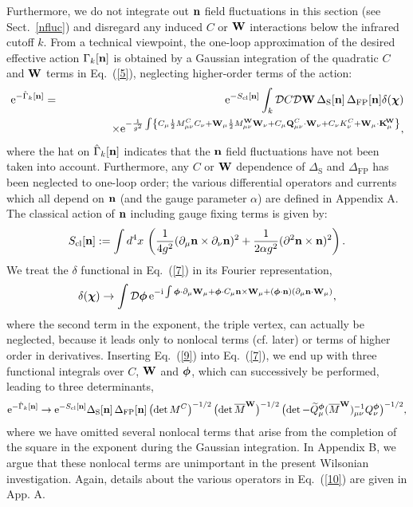 \documentclass[a4paper,12pt]{article}
\newcommand{\I}{\text{i}}
\newcommand{\E}{\text{e}}
\newcommand{\re}[1]{~(\ref{#1})}
\begin{document}
Furthermore, we do not integrate out $\mathbf{n}$ field fluctuations in this
section (see Sect.~\ref{nfluc}) and disregard any induced $C$ or $\mathbf{W}$
interactions below the infrared cutoff $k$. From a technical
viewpoint, the one-loop approximation of the desired effective action
$\Gamma_k[\mathbf{n}]$ is obtained by a Gaussian integration of the quadratic
$C$ and $\mathbf{W}$ terms in Eq.\re{5}, neglecting higher-order terms of the
action:
\begin{eqnarray}
\E^{-\hat{\Gamma}_k[\mn]} &=&\E^{-S_{\text{cl}}[\mn]} 
\int_k {\cal  D}C{\cal D}\mW\, \Delta_{\text{S}}[\mn]\,
\Delta_{\text{FP}}[\mn] \delta(\mX)  \label{7}\\
&&\qquad\qquad \times
  \E^{-\frac{1}{g^2}\int \left\{ C_\mu \case{1}{2} M^C_{\mu\nu} C_\nu
  +\mW_\mu \case{1}{2} M^{\mW}_{\mu\nu}\mW_\nu +C_\mu
  \mQ^C_{\mu\nu}\cdot \mW_\nu +C_\nu K^C_\nu +\mW_\mu \cdot
  \mK_\mu\right\} }, \nonumber 
\end{eqnarray}
where the hat on $\hat{\Gamma}_k[\mathbf{n}]$ indicates that the $\mathbf{n}$ field
fluctuations have not been taken into account. Furthermore, any $C$ or
$\mathbf{W}$ dependence of $\Delta_{\text{S}}$ and $\Delta_{\text{FP}}$ has
been neglected to one-loop order; the various differential operators
and currents which all depend on $\mathbf{n}$ (and the gauge parameter
$\alpha$) are defined in Appendix A. The classical action of $\mathbf{n}$
including gauge fixing terms is given by:
\begin{equation}
S_{\text{cl}}[\mathbf{n}]:= \int d^4x\, \left( \frac{1}{4g^2}
  (\partial_\mu\mathbf{n} \times \partial_\nu\mathbf{n})^2 + \frac{1}{2\alpha g^2}
  (\partial^2\mathbf{n} \times \mathbf{n})^2\right). \label{8}
\end{equation}
We treat the $\delta$ functional in Eq.\re{7} in its Fourier
representation,
\begin{equation}
\delta(\mX)\to \int{\cal D}\mF \,\E^{-\I \int \mF\cdot\partial_\mu
  \mW_\mu +\mF\cdot C_\mu \mn\times \mW_\mu+ (\mF\cdot\mn)(\partial_\mu \mn
  \cdot \mW_\mu)}, \label{9}
\end{equation}
where the second term in the exponent, the triple vertex, can actually
be neglected, because it leads only to nonlocal terms (cf. later) or
terms of higher order in derivatives. Inserting Eq.\re{9} into
Eq.\re{7}, we end up with three functional integrals over $C$, $\mathbf{W}$
and $\boldsymbol{\phi}$, which can successively be performed, leading to three
determinants,
\begin{equation}
\E^{-\hat{\Gamma}_k[\mn]} \to\E^{-S_{\text{cl}}[\mn]}
\Delta_{\text{S}}[\mn]\,\Delta_{\text{FP}}[\mn] \, \bigl( \det
M^C\bigr)^{-1/2} \, \bigl(\det \overline{M}^{\mW}\bigr)^{-1/2}\, \bigl(
\det - \widetilde{Q}^{\mF}_\mu (\overline{M}^{\mW})^{-1}_{\mu\nu}
Q^{\mF}_\nu \bigr)^{-1/2}, \label{10}
\end{equation}
where we have omitted several nonlocal terms that arise from the
completion of the square in the exponent during the Gaussian
integration. In Appendix B, we argue that these nonlocal terms are
unimportant in the present Wilsonian investigation. Again, details
about the various operators in Eq.\re{10} are given in App. A.
\end{document}
